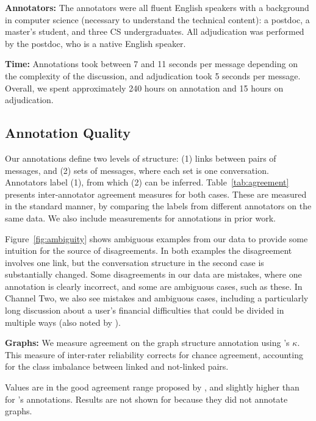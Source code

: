 \documentclass[11pt,a4paper]{article}
\newcommand{\tightparagraph}[1]{\noindent\textbf{#1:}}
\begin{document}
\tightparagraph{Annotators}
The annotators were all fluent English speakers with a background in computer science (necessary to understand the technical content): a postdoc, a master's student, and three CS undergraduates.
All adjudication was performed by the postdoc, who is a native English speaker.

\tightparagraph{Time}
Annotations took between 7 and 11 seconds per message depending on the complexity of the discussion, and adjudication took 5 seconds per message.
Overall, we spent approximately 240 hours on annotation and 15 hours on adjudication.

\subsection{Annotation Quality} \label{sec:agreement}

Our annotations define two levels of structure:
(1) links between pairs of messages, and
(2) sets of messages, where each set is one conversation.
Annotators label (1), from which (2) can be inferred.
Table~\ref{tab:agreement} presents inter-annotator agreement measures for both cases.
These are measured in the standard manner, by comparing the labels from different annotators on the same data.
We also include measurements for annotations in prior work.

Figure~\ref{fig:ambiguity} shows ambiguous examples from our data to provide some intuition for the source of disagreements.
In both examples the disagreement involves one link, but the conversation structure in the second case is substantially changed.
Some disagreements in our data are mistakes, where one annotation is clearly incorrect, and some are ambiguous cases, such as these.
In Channel Two, we also see mistakes and ambiguous cases, including a particularly long discussion about a user's financial difficulties that could be divided in multiple ways (also noted by \citet{elsner:2008}).


\tightparagraph{Graphs}
We measure agreement on the graph structure annotation using \citet{Cohen:1960}'s $\kappa$.
This measure of inter-rater reliability corrects for chance agreement, accounting for the class imbalance between linked and not-linked pairs.

Values are in the good agreement range proposed by \citet{altman:1990}, and slightly higher than for \citet{Mehri:2017:IJCNLP}'s annotations.
Results are not shown for \citet{elsner:2008} because they did not annotate graphs.
\end{document}
